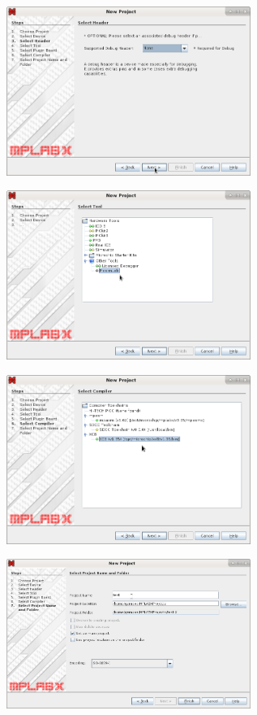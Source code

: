 \begin{figure}[H]
\center
\includegraphics[width=0.71\textwidth]{img/hmd/mplab13.png} 
\end{figure} 

\begin{figure}[H]
\center
\includegraphics[width=0.71\textwidth]{img/hmd/mplab14.png} 
\end{figure} 

\begin{figure}[H]
\center
\includegraphics[width=0.71\textwidth]{img/hmd/mplab15.png} 
\end{figure} 

\begin{figure}[H]
\center
\includegraphics[width=0.71\textwidth]{img/hmd/mplab16.png} 
\end{figure} 

